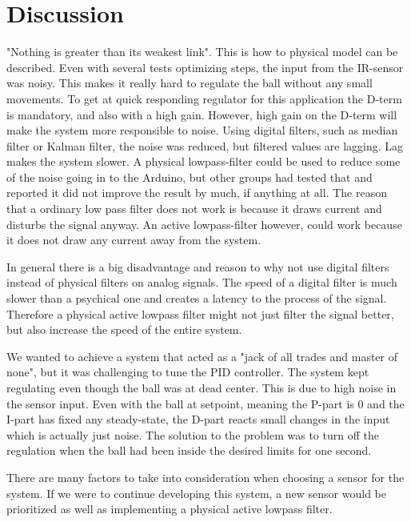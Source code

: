 \section{Discussion}
"Nothing is greater than its weakest link". This is how to physical model can be described. Even with several tests optimizing steps, the input from the IR-sensor was noisy. This makes it really hard to regulate the ball without any small movements. To get at quick responding regulator for this application the D-term is mandatory, and also with a high gain. However, high gain on the D-term will make the system more responsible to noise. Using digital filters, such as median filter or Kalman filter, the noise was reduced, but filtered values are lagging. Lag makes the system slower.
A physical lowpass-filter could be used to reduce some of the noise going in to the Arduino, but other groups had tested that and reported it did not improve the result by much, if anything at all. The reason that a ordinary low pass filter does not work is because it draws current and disturbs the signal anyway. An active lowpass-filter however, could work because it does not draw any current away from the system.

In general there is a big disadvantage and reason to why not use digital filters instead of physical filters on analog signals. The speed of a digital filter is much slower than a psychical one and creates a latency to the process of the signal. Therefore a physical active lowpass filter might not just filter the signal better, but also increase the speed of the entire system. 

We wanted to achieve a system that acted as a "jack of all trades and master of none", but it was challenging to tune the PID controller. The system kept regulating even though the ball 
was at dead center. This is due to high noise in the sensor input. Even with the ball at setpoint, meaning the P-part is 0 and the I-part has fixed any steady-state, the D-part reacts small changes in the input which is actually just noise. The solution to the problem was to turn off the regulation when the ball had been inside the desired limits for one second.

There are many factors to take into consideration when choosing a sensor for the system. If we were to continue developing this system, a new sensor would be prioritized as well as implementing a physical active lowpass filter. 